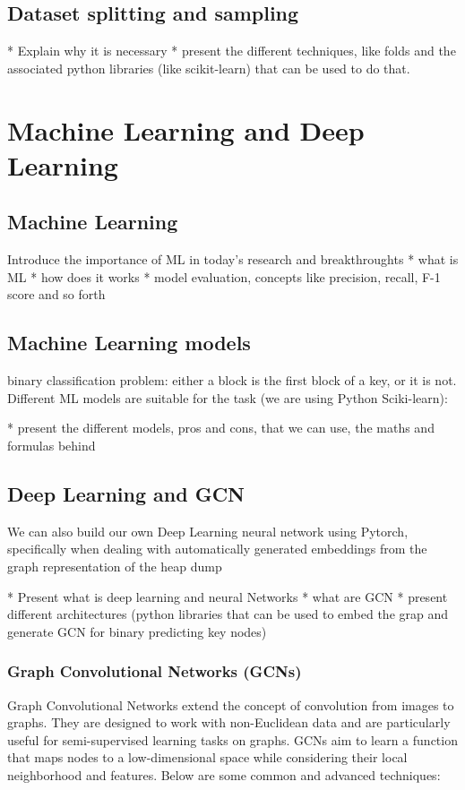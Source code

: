     \subsection{Dataset splitting and sampling}
    * Explain why it is necessary
    * present the different techniques, like folds and the associated python libraries (like scikit-learn) that can be used to do that.

\section{Machine Learning and Deep Learning}\label{sec:background:ml}
    \subsection{Machine Learning}
    Introduce the importance of ML in today's research and breakthroughts
    * what is ML
    * how does it works
    * model evaluation, concepts like precision, recall, F-1 score and so forth

    \subsection{Machine Learning models}
    binary classification problem: either a block is the first block of a key, or it is not. Different ML models are suitable for the task (we are using Python Sciki-learn):

    * present the different models, pros and cons, that we can use, the maths and formulas behind

    \subsection{Deep Learning and GCN}
    We can also build our own Deep Learning neural network using Pytorch, specifically when dealing with automatically generated embeddings from the graph representation of the heap dump

    * Present what is deep learning and neural Networks
    * what are GCN
    * present different architectures (python libraries that can be used to embed the grap and generate GCN for binary predicting key nodes)

    \subsubsection{Graph Convolutional Networks (GCNs)}
    Graph Convolutional Networks extend the concept of convolution from images to graphs. They are designed to work with non-Euclidean data and are particularly useful for semi-supervised learning tasks on graphs. GCNs aim to learn a function that maps nodes to a low-dimensional space while considering their local neighborhood and features. Below are some common and advanced techniques:

